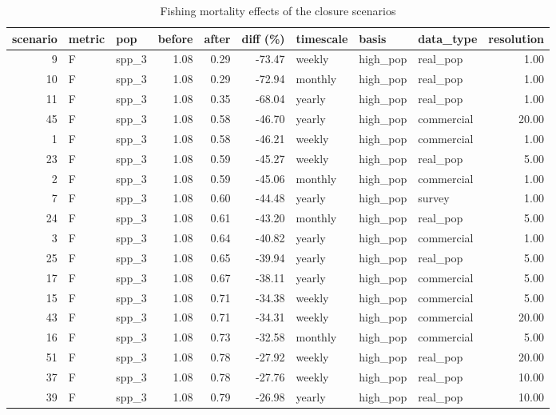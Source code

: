 \begin{longtable}{rllrrrlllr}
\caption{Fishing mortality effects of the closure scenarios} \\ 
  \hline
scenario & metric & pop & before & after & diff (\%) & timescale & basis & data\_type & resolution \\ 
  \hline
  9 & F & spp\_3 & 1.08 & 0.29 & -73.47 & weekly & high\_pop & real\_pop & 1.00 \\ 
   10 & F & spp\_3 & 1.08 & 0.29 & -72.94 & monthly & high\_pop & real\_pop & 1.00 \\ 
   11 & F & spp\_3 & 1.08 & 0.35 & -68.04 & yearly & high\_pop & real\_pop & 1.00 \\ 
   45 & F & spp\_3 & 1.08 & 0.58 & -46.70 & yearly & high\_pop & commercial & 20.00 \\ 
    1 & F & spp\_3 & 1.08 & 0.58 & -46.21 & weekly & high\_pop & commercial & 1.00 \\ 
   23 & F & spp\_3 & 1.08 & 0.59 & -45.27 & weekly & high\_pop & real\_pop & 5.00 \\ 
    2 & F & spp\_3 & 1.08 & 0.59 & -45.06 & monthly & high\_pop & commercial & 1.00 \\ 
    7 & F & spp\_3 & 1.08 & 0.60 & -44.48 & yearly & high\_pop & survey & 1.00 \\ 
   24 & F & spp\_3 & 1.08 & 0.61 & -43.20 & monthly & high\_pop & real\_pop & 5.00 \\ 
    3 & F & spp\_3 & 1.08 & 0.64 & -40.82 & yearly & high\_pop & commercial & 1.00 \\ 
   25 & F & spp\_3 & 1.08 & 0.65 & -39.94 & yearly & high\_pop & real\_pop & 5.00 \\ 
   17 & F & spp\_3 & 1.08 & 0.67 & -38.11 & yearly & high\_pop & commercial & 5.00 \\ 
   15 & F & spp\_3 & 1.08 & 0.71 & -34.38 & weekly & high\_pop & commercial & 5.00 \\ 
   43 & F & spp\_3 & 1.08 & 0.71 & -34.31 & weekly & high\_pop & commercial & 20.00 \\ 
   16 & F & spp\_3 & 1.08 & 0.73 & -32.58 & monthly & high\_pop & commercial & 5.00 \\ 
   51 & F & spp\_3 & 1.08 & 0.78 & -27.92 & weekly & high\_pop & real\_pop & 20.00 \\ 
   37 & F & spp\_3 & 1.08 & 0.78 & -27.76 & weekly & high\_pop & real\_pop & 10.00 \\ 
   39 & F & spp\_3 & 1.08 & 0.79 & -26.98 & yearly & high\_pop & real\_pop & 10.00 \\ 

\end{longtable}
